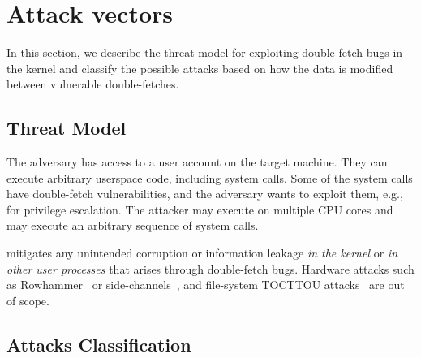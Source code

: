 \documentclass[letterpaper,twocolumn,10pt, anonymous]{article}
\begin{document}
\section{Attack vectors}
\label{sec:threats}

In this section, we describe the threat model for exploiting double-fetch
bugs in the kernel and classify the possible attacks based on how the 
data is modified between vulnerable double-fetches.

\subsection{Threat Model}
\label{sec:threatmodel}

The adversary has access to a user account on the target machine. They can
execute arbitrary userspace code, including system calls. Some of the system 
calls have double-fetch vulnerabilities, and the adversary wants to exploit them,
e.g., for privilege escalation.
The attacker may execute on multiple CPU cores and may execute an arbitrary 
sequence of system calls. 

\tiktok mitigates any unintended corruption or information leakage \emph{in the kernel}
or \emph{in other user processes} that arises through double-fetch bugs. 
Hardware attacks such as Rowhammer~\cite{mutlu2019rowhammer}
or side-channels~\cite{kocher2019spectre}, and file-system TOCTTOU
attacks~\cite{payer2012protecting, pu2006methodical, wei2010modeling,
tsafrir2008portably} are out of scope.

\subsection{Attacks Classification}
\label{sec:attacks}
\end{document}
